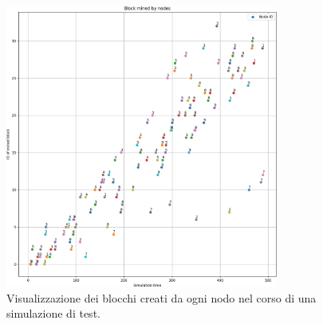 \begin{figure}[H]
    \centering
    \includegraphics[width=0.8\textwidth]{images/blockmined.png}
    \caption{Visualizzazione dei blocchi creati da ogni nodo nel corso di una simulazione di test.}
\end{figure}

